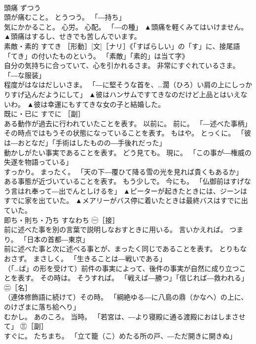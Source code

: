 \documentclass[8pt]{extreport}
\begin{document}
\begin{CJK}{UTF8}{min}
\\	頭痛	ずつう	
\\	頭が痛むこと。 とうつう。 「―持ち」 
\\	気にかかること。 心労。 心配。 「―の種」	▲頭痛を軽くみてはいけません。 ▲頭痛はするし、せきでも苦しんでいます。
\\	素敵・素的	すてき	［形動］[文]［ナリ］《「すばらしい」の「す」に、接尾語「てき」の付いたものという。 「素敵」「素的」は当て字》 
\\	自分の気持ちに合っていて、心を引かれるさま。 非常にすぐれているさま。 「―な服装」 
\\	程度がはなはだしいさま。 「―に堅そうな首を、…濶（ひろ）い肩の上にしっかりすげ込んだようにして」	▲彼はハンサムですてきなのだけど上品とはいえないわ。 ▲彼は幸運にもすてきな女の子と結婚した。
\\	既に・已に	すでに	［副］ 
\\	ある動作が過去に行われていたことを表す。 以前に。 前に。 「―述べた事柄」 
\\	その時点ではもうその状態になっていることを表す。 もはや。 とっくに。 「彼は―おとなだ」「手術はしたものの―手後れだった」 
\\	動かしがたい事実であることを表す。 どう見ても。 現に。 「この事が―権威の失遂を物語っている」 
\\	すっかり。 まったく。 「天の下―覆ひて降る雪の光を見れば貴くもあるか」 
\\	ある事態が近づいていることを表す。 もう少しで。 今にも。 「仏御前はすげなう言はれ奉って―出でんとしけるを」	▲ピーターが起きたときには、ジーンはすでに家を出ていた。 ▲メアリーがバス停に着いたときは最終バスはすでに出ていた。
\\	即ち・則ち・乃ち	すなわち	㊀［接］ 
\\	前に述べた事を別の言葉で説明しなおすときに用いる。 言いかえれば。 つまり。 「日本の首都―東京」 
\\	前に述べた事と次に述べる事とが、まったく同じであることを表す。 とりもなおさず。 まさしく。 「生きることは―戦いである」 
\\	（「…ば」の形を受けて）前件の事実によって、後件の事実が自然に成り立つことを表す。 その時は。 そうすれば。 「戦えば―勝つ」「信じれば―救われる」 ㊁［名］ 
\\	（連体修飾語に続けて）その時。 「綱絶ゆる―に八島の鼎（かなへ）の上に、のけざまに落ち給へり」 
\\	むかし。 あのころ。 当時。 「若宮は、―より寝殿に通る渡殿におはしまさせて」 ㊂［副］ 
\\	すぐに。 たちまち。 「立て籠（こ）めたる所の戸、―ただ開きに開きぬ」 

\end{CJK}
\end{document}

